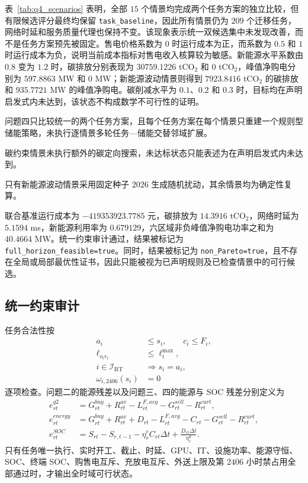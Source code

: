 表~\ref{tab:q4_scenarios} 表明，全部 $15$ 个情景均完成两个任务方案的独立比较，但有限候选评分最终均保留 \texttt{task\_baseline}，因此所有情景仍为 $209$ 个迁移任务，网络时延和服务质量代理也保持不变。该现象表示统一双候选集中未发现改善，而不是任务方案预先被固定。售电价格系数为 $0$ 时运行成本为正，而系数为 $0.5$ 和 $1$ 时运行成本为负，说明当前成本指标对售电收入核算较为敏感。新能源水平系数由 $0.8$ 变为 $1.2$ 时，碳排放分别表现为 $30759.1226$ tCO$_2$ 和 $0$ tCO$_2$，峰值净购电分别为 $597.8863$ MW 和 $0$ MW；新能源波动情景则得到 $7923.8416$ tCO$_2$ 的碳排放和 $935.7721$ MW 的峰值净购电。碳削减水平为 $0.1$、$0.2$ 和 $0.3$ 时，目标均在声明启发式内未达到，该状态不构成数学不可行性的证明。

问题四只比较统一的两个任务方案，且每个任务方案在每个情景只重建一个规则型储能策略，未执行逐情景多轮任务—储能交替邻域扩展。

碳约束情景未执行额外的碳定向搜索，未达标状态只能表述为在声明启发式内未达到。

只有新能源波动情景采用固定种子 $2026$ 生成随机扰动，其余情景均为确定性复算。

联合基准运行成本为 $-419353923.7785$ 元，碳排放为 $14.3916$ tCO$_2$，网络时延为 $5.1594$ ms，新能源利用率为 $0.679129$，六区域非负峰值净购电功率之和为 $40.4664$ MW。统一约束审计通过，结果被标记为 \texttt{full\_horizon\_feasible=true}。同时，结果被标记为 \texttt{non\_Pareto=true}，且不存在全局或局部最优性证书，因此只能被视为已声明规则及已检查情景中的可行候选。

\subsection{统一约束审计}

任务合法性按
\begin{align}
a_i&\le s_i,\qquad c_i\le F_i,\\
\ell_{o_ir_i}&\le\ell_i^{\max},\\
i\in\mathcal I_{\mathrm{RT}}&\Rightarrow s_i=a_i,\\
\omega_{i,2406}(s_i)&=0
\end{align}
逐项检查。问题二的能源残差以及问题三、四的能源与 SOC 残差分别定义为
\begin{align}
e_{rt}^{q2}
&=G_{rt}^{buy}+R_{rt}^{av}
-L_{rt}^{F,avg}-G_{rt}^{sell}-R_{rt}^{curt},\\
e_{rt}^{energy}
&=G_{rt}^{buy}+R_{rt}^{av}+D_{rt}
-L_{rt}^{F,avg}-C_{rt}-G_{rt}^{sell}-R_{rt}^{curt},\\
e_{rt}^{SOC}
&=S_{rt}-S_{r,t-1}-\eta_r^cC_{rt}\Delta t
+\frac{D_{rt}\Delta t}{\eta_r^d}.
\end{align}
只有任务唯一执行、实时开工、截止、时延、GPU、IT、设施功率、能源守恒、SOC、终端 SOC、购售电互斥、充放电互斥、外送上限及第 $2406$ 小时禁占用全部通过时，才输出全时域可行状态。

